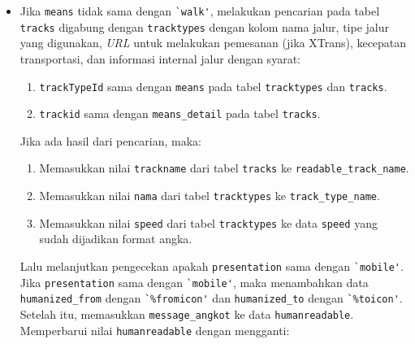 \begin{itemize}
\begin{itemize}
		 \item Jika \verb!means! tidak sama dengan \verb!`walk'!, melakukan pencarian pada tabel \verb!tracks! digabung dengan \verb!tracktypes! dengan kolom nama jalur, tipe jalur yang digunakan, \textit{URL} untuk melakukan pemesanan (jika XTrans), kecepatan transportasi, dan informasi internal jalur dengan syarat:
				\begin{enumerate}
					\item \verb!trackTypeId! sama dengan \verb!means! pada tabel \verb!tracktypes! dan \verb!tracks!.
					\item \verb!trackid! sama dengan \verb!means_detail! pada tabel \verb!tracks!.
				\end{enumerate}						 
		  Jika ada hasil dari pencarian, maka: 
		  \begin{enumerate}
		  		\item Memasukkan nilai \verb!trackname! dari tabel \verb!tracks! ke \verb!readable_track_name!.
		  		\item Memasukkan nilai \verb!nama! dari tabel \verb!tracktypes! ke \verb!track_type_name!.
		  		\item Memasukkan nilai \verb!speed! dari tabel \verb!tracktypes! ke data \verb!speed! yang sudah dijadikan format angka.
		  \end{enumerate}
		  Lalu melanjutkan pengecekan apakah \verb!presentation! sama dengan \verb!`mobile'!. Jika \verb!presentation! sama dengan \verb!`mobile'!, maka menambahkan data \verb!humanized_from! dengan \verb!`%fromicon'! dan \verb!humanized_to! dengan \verb!`%toicon'!. Setelah itu, memasukkan \verb!message_angkot! ke data \verb!humanreadable!. Memperbarui nilai \verb!humanreadable! dengan mengganti:
		  

\end{itemize}
\end{itemize}

